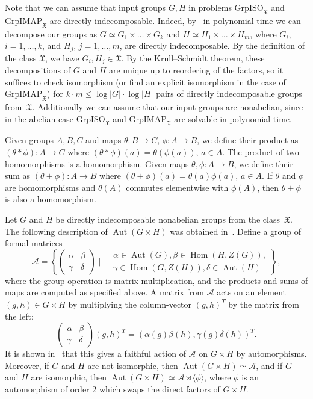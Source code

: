 \documentclass{article}
\DeclareMathOperator{\Aut}{Aut}
\DeclareMathOperator{\Hom}{Hom}
\newcommand{\X}{\mathfrak{X}}
\begin{document}
Note that we can assume that input groups \( G, H \) in problems \( \mathrm{GrpISO}_\X \) and \( \mathrm{GrpIMAP}_\X \) are directly indecomposable.
Indeed, by~\cite{kayal} in polynomial time we can decompose our groups as \( G \simeq G_1 \times \dots \times G_k \) and \( H \simeq H_1 \times \dots \times H_m \),
where \( G_i \), \( i = 1, \dots, k \), and \( H_j \), \( j = 1, \dots, m \), are directly indecomposable.
By the definition of the class \( \X \), we have \( G_i, H_j \in \X \). By the Krull--Schmidt theorem, these decompositions of \( G \) and \( H \)
are unique up to reordering of the factors, so it suffices to check isomorphism (or find an explicit isomorphism in the case of \( \mathrm{GrpIMAP}_\X \))
for \( k \cdot m \leq \log |G| \cdot \log |H| \) pairs of directly indecomposable groups from~\( \X \).
Additionally we can assume that our input groups are nonabelian,
since in the abelian case \( \mathrm{GrpISO}_\X \) and \( \mathrm{GrpIMAP}_\X \) are solvable in polynomial time.

Given groups \( A, B, C \) and maps \( \theta : B \to C \), \( \phi : A \to B \), we define their product as
\( (\theta * \phi) : A \to C \) where \( (\theta * \phi)(a) = \theta(\phi(a)) \), \( a \in A \).
The product of two homomorphisms is a homomorphism.
Given maps \( \theta, \phi : A \to B \), we define their sum as \( (\theta + \phi) : A \to B \) where \( (\theta + \phi)(a) = \theta(a)\phi(a) \), \( a \in A \).
If \( \theta \) and \( \phi \) are homomorphisms and \( \theta(A) \) commutes elementwise with \( \phi(A) \), then \( \theta + \phi \) is also a homomorphism.

Let \( G \) and \( H \) be directly indecomposable nonabelian groups from the class~\( \X \).
The following description of \( \Aut(G \times H) \) was obtained in~\cite{bidwell, bidwell2}.
Define a group of formal matrices
\[ \mathcal{A} = \left\{ \begin{pmatrix} \alpha & \beta \\ \gamma & \delta \end{pmatrix} \mid \begin{aligned} &\alpha \in \Aut(G), \beta \in \Hom(H, Z(G)),\\
&\gamma \in \Hom(G, Z(H)), \delta \in \Aut(H) \end{aligned} \right\}, \]
where the group operation is matrix multiplication, and the products and sums of maps are computed as specified above.
A matrix from \( \mathcal{A} \) acts on an element \( (g, h) \in G \times H \) by multiplying the column-vector \( (g, h)^T \) by the matrix from the left:
\[ \tag{\(\star\)} \begin{pmatrix} \alpha & \beta \\ \gamma & \delta \end{pmatrix} (g, h)^T = (\alpha(g)\beta(h), \gamma(g)\delta(h))^T. \]
It is shown in~\cite{bidwell, bidwell2} that this gives a faithful action of \( \mathcal{A} \) on \( G \times H \) by automorphisms.
Moreover, if \( G \) and \( H \) are not isomorphic, then \( \Aut(G \times H) \simeq \mathcal{A} \), and if \( G \) and \( H \) are isomorphic, then
\( \Aut(G \times H) \simeq \mathcal{A} \rtimes \langle \phi \rangle \),
where \( \phi \) is an automorphism of order \( 2 \) which swaps the direct factors of \( G \times H \).
\end{document}
